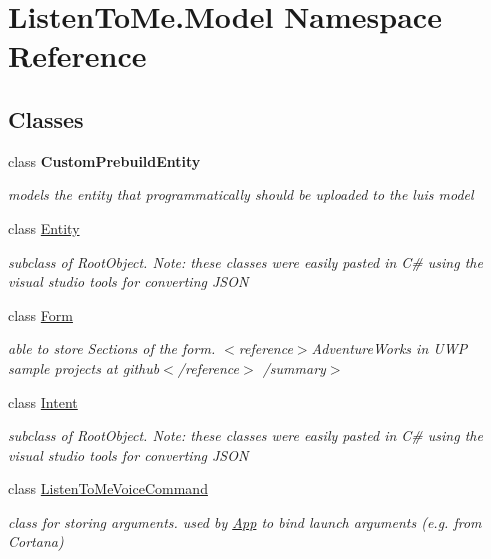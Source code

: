 \hypertarget{namespace_listen_to_me_1_1_model}{}\section{Listen\+To\+Me.\+Model Namespace Reference}
\label{namespace_listen_to_me_1_1_model}
\subsection*{Classes}
\begin{DoxyCompactItemize}
\item 
class {\bfseries Custom\+Prebuild\+Entity}
\begin{DoxyCompactList}\small\item\em models the entity that programmatically should be uploaded to the luis model \end{DoxyCompactList}\item 
class \hyperlink{class_listen_to_me_1_1_model_1_1_entity}{Entity}
\begin{DoxyCompactList}\small\item\em subclass of Root\+Object. Note\+: these classes were easily pasted in C\# using the visual studio tools for converting J\+S\+ON \end{DoxyCompactList}\item 
class \hyperlink{class_listen_to_me_1_1_model_1_1_form}{Form}
\begin{DoxyCompactList}\small\item\em able to store Sections of the form. $<$reference$>$Adventure\+Works in U\+WP sample projects at github$<$/reference$>$ /summary$>$ \end{DoxyCompactList}\item 
class \hyperlink{class_listen_to_me_1_1_model_1_1_intent}{Intent}
\begin{DoxyCompactList}\small\item\em subclass of Root\+Object. Note\+: these classes were easily pasted in C\# using the visual studio tools for converting J\+S\+ON \end{DoxyCompactList}\item 
class \hyperlink{class_listen_to_me_1_1_model_1_1_listen_to_me_voice_command}{Listen\+To\+Me\+Voice\+Command}
\begin{DoxyCompactList}\small\item\em class for storing arguments. used by \hyperlink{class_listen_to_me_1_1_app}{App} to bind launch arguments (e.\+g. from Cortana) \end{DoxyCompactList}\item 

\end{DoxyCompactItemize}

